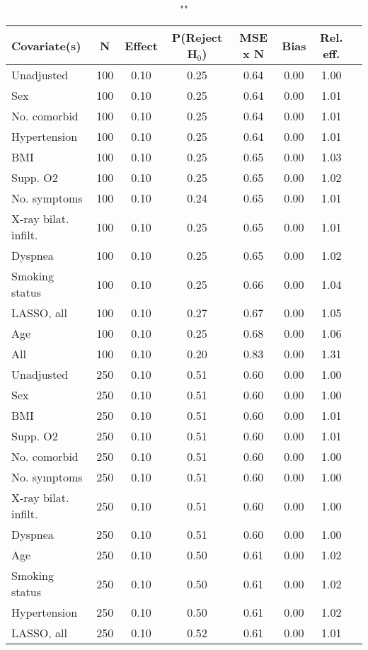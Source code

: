 \documentclass{article}
\begin{document}
{\tabcolsep=6pt  %
\begin{longtable}{lccccccc}
\caption{""} \\
Covariate(s) & N & Effect & P(Reject H$_0$) & MSE x N & Bias & Rel. eff.\\ \midrule
Unadjusted & 100 & 0.10 & 0.25 & 0.64 & 0.00 & 1.00 \\ 
Sex & 100 & 0.10 & 0.25 & 0.64 & 0.00 & 1.01 \\ 
No. comorbid & 100 & 0.10 & 0.25 & 0.64 & 0.00 & 1.01 \\ 
Hypertension & 100 & 0.10 & 0.25 & 0.64 & 0.00 & 1.01 \\ 
BMI & 100 & 0.10 & 0.25 & 0.65 & 0.00 & 1.03 \\ 
Supp. O2 & 100 & 0.10 & 0.25 & 0.65 & 0.00 & 1.02 \\ 
No. symptoms & 100 & 0.10 & 0.24 & 0.65 & 0.00 & 1.01 \\ 
X-ray bilat. infilt. & 100 & 0.10 & 0.25 & 0.65 & 0.00 & 1.01 \\ 
Dyspnea & 100 & 0.10 & 0.25 & 0.65 & 0.00 & 1.02 \\ 
Smoking status & 100 & 0.10 & 0.25 & 0.66 & 0.00 & 1.04 \\ 
LASSO, all & 100 & 0.10 & 0.27 & 0.67 & 0.00 & 1.05 \\ 
Age & 100 & 0.10 & 0.25 & 0.68 & 0.00 & 1.06 \\ 
All & 100 & 0.10 & 0.20 & 0.83 & 0.00 & 1.31 \\ \midrule 
Unadjusted & 250 & 0.10 & 0.51 & 0.60 & 0.00 & 1.00 \\ 
Sex & 250 & 0.10 & 0.51 & 0.60 & 0.00 & 1.00 \\ 
BMI & 250 & 0.10 & 0.51 & 0.60 & 0.00 & 1.01 \\ 
Supp. O2 & 250 & 0.10 & 0.51 & 0.60 & 0.00 & 1.01 \\ 
No. comorbid & 250 & 0.10 & 0.51 & 0.60 & 0.00 & 1.00 \\ 
No. symptoms & 250 & 0.10 & 0.51 & 0.60 & 0.00 & 1.00 \\ 
X-ray bilat. infilt. & 250 & 0.10 & 0.51 & 0.60 & 0.00 & 1.00 \\ 
Dyspnea & 250 & 0.10 & 0.51 & 0.60 & 0.00 & 1.00 \\ 
Age & 250 & 0.10 & 0.50 & 0.61 & 0.00 & 1.02 \\ 
Smoking status & 250 & 0.10 & 0.50 & 0.61 & 0.00 & 1.02 \\ 
Hypertension & 250 & 0.10 & 0.50 & 0.61 & 0.00 & 1.02 \\ 
LASSO, all & 250 & 0.10 & 0.52 & 0.61 & 0.00 & 1.01 \\ 

\end{longtable}}
\end{document}
